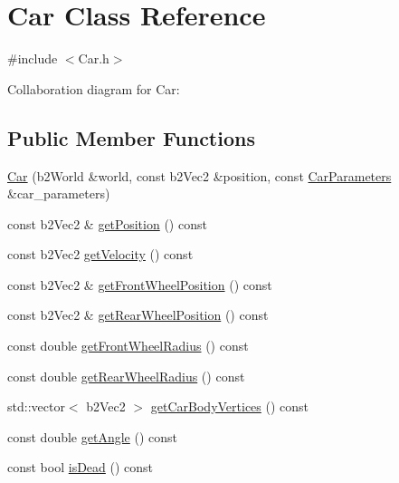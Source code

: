 \hypertarget{classCar}{}\section{Car Class Reference}
\label{classCar}


{\ttfamily \#include $<$Car.\+h$>$}



Collaboration diagram for Car\+:
\subsection*{Public Member Functions}
\begin{DoxyCompactItemize}
\item 
\hyperlink{classCar_aedf13bf38dd3f77f92db6ea7f4ebab6b}{Car} (b2\+World \&world, const b2\+Vec2 \&position, const \hyperlink{classCarParameters}{Car\+Parameters} \&car\+\_\+parameters)
\item 
const b2\+Vec2 \& \hyperlink{classCar_aedf5fdf009d300cd2dc7faa51f30224b}{get\+Position} () const
\item 
const b2\+Vec2 \hyperlink{classCar_a3be84dd5291ab0fcd0110b78d8757cc1}{get\+Velocity} () const
\item 
const b2\+Vec2 \& \hyperlink{classCar_a0e86ef897f09538a3815965b99d97f48}{get\+Front\+Wheel\+Position} () const
\item 
const b2\+Vec2 \& \hyperlink{classCar_a66a6f10dda6b6f5a58126d58eba6f2d0}{get\+Rear\+Wheel\+Position} () const
\item 
const double \hyperlink{classCar_a00f0b724a34f1f98411e098492823bf1}{get\+Front\+Wheel\+Radius} () const
\item 
const double \hyperlink{classCar_aeb0e2313eb141c7977f3c1a9a2737933}{get\+Rear\+Wheel\+Radius} () const
\item 
std\+::vector$<$ b2\+Vec2 $>$ \hyperlink{classCar_a54179bc7ddca42a4f285c0475174f5b5}{get\+Car\+Body\+Vertices} () const
\item 
const double \hyperlink{classCar_aeb9ab35989aee09eecccc786ae08c89c}{get\+Angle} () const
\item 
const bool \hyperlink{classCar_a681870b52aa9ad835ddbfcf74ceee84d}{is\+Dead} () const
\end{DoxyCompactItemize}
